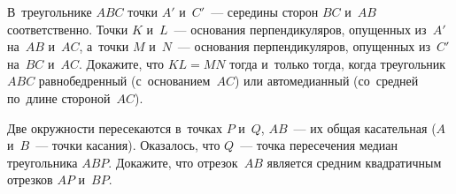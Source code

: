 \begin{problems}
\item
В~треугольнике $ABC$ точки $A'$ и~$C'$~--- середины сторон $BC$ и~$AB$
соответственно.
Точки $K$ и~$L$~--- основания перпендикуляров, опущенных из~$A'$
на~$AB$ и~$AC$, а~точки $M$ и~$N$~--- основания перпендикуляров, опущенных
из~$C'$ на~$BC$ и~$AC$.
Докажите, что $KL = MN$ тогда и~только тогда, когда треугольник $ABC$
равнобедренный (с~основанием~$AC$) или автомедианный (со~средней по~длине
стороной~$AC$).

\item
Две окружности пересекаются в~точках $P$ и~$Q$, $AB$~--- их общая касательная
($A$ и~$B$~--- точки касания).
Оказалось, что $Q$~--- точка пересечения медиан треугольника $ABP$.
Докажите, что отрезок~$AB$ является средним квадратичным отрезков $AP$ и~$BP$.

\end{problems}

